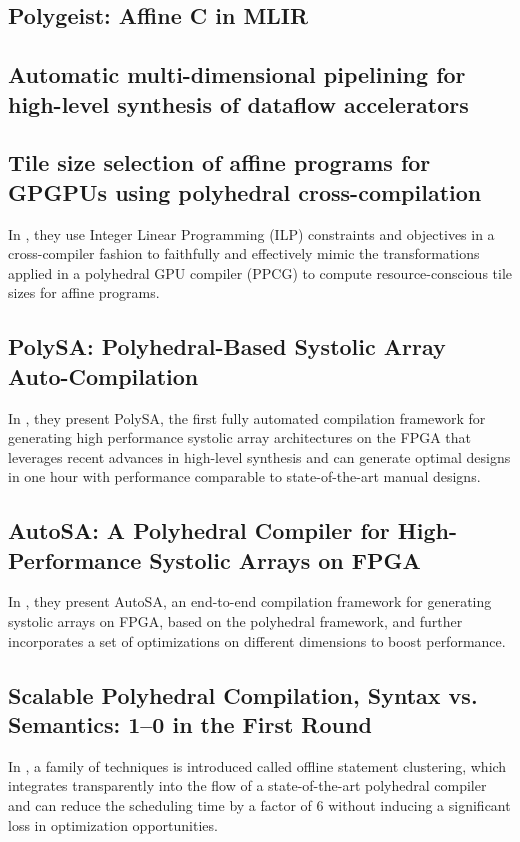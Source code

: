 \documentclass[a4paper, 11pt]{article}
\begin{document}
\subsection{Polygeist: Affine C in MLIR}

\subsection{Automatic multi-dimensional pipelining for high-level synthesis of dataflow accelerators}

\subsection{Tile size selection of affine programs for GPGPUs using polyhedral cross-compilation}
In \cite{Abdelaal2021TileSS}, they use Integer Linear Programming (ILP) constraints and objectives in a cross-compiler fashion to faithfully and effectively mimic the transformations applied in a polyhedral GPU compiler (PPCG) to compute resource-conscious tile sizes for affine programs.

\subsection{PolySA: Polyhedral-Based Systolic Array Auto-Compilation}
In \cite{Cong2018PolySAPS}, they present PolySA, the first fully automated compilation framework for generating high performance systolic array architectures on the FPGA that leverages recent advances in high-level synthesis and can generate optimal designs in one hour with performance comparable to state-of-the-art manual designs.

\subsection{AutoSA: A Polyhedral Compiler for High-Performance Systolic Arrays on FPGA}
In \cite{Wang2021AutoSAAP}, they present AutoSA, an end-to-end compilation framework for generating systolic arrays on FPGA, based on the polyhedral framework, and further incorporates a set of optimizations on different dimensions to boost performance.

\subsection{Scalable Polyhedral Compilation, Syntax vs. Semantics: 1–0 in the First Round}
In \cite{48842}, a family of techniques is introduced called offline statement clustering, which integrates transparently into the flow of a state-of-the-art polyhedral compiler and can reduce the scheduling time by a factor of 6 without inducing a significant loss in optimization opportunities.
\end{document}
